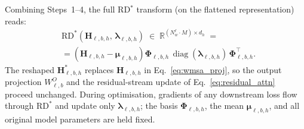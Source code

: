Combining Steps~1--4, the full RD$^*$\xspace transform (on the flattened
representation) reads:
\begin{equation}
\begin{aligned}
    &\mathrm{RD}^*\!\left(\mathbf{H}_{\ell,b,h},\,
                          \boldsymbol{\lambda}_{\ell,b,h}\right) \;\in\; \mathbb{R}^{(N_w^\ell \cdot M) \times d_h}
    \;=\;\\
    &=\left(\mathbf{H}_{\ell,b,h} - \boldsymbol{\mu}_{\ell,b,h}\right)
    \boldsymbol{\Phi}_{\ell,b,h}\,
    \operatorname{diag}(\boldsymbol{\lambda}_{\ell,b,h})\,
    \boldsymbol{\Phi}_{\ell,b,h}^\top.
\end{aligned}
\label{eq:rd_star}
\end{equation}
The reshaped $\mathbf{H}^*_{\ell,b,h}$ replaces $\mathbf{H}_{\ell,b,h}$
in Eq.~\eqref{eq:wmsa_proj}, so the output projection $W^O_{\ell,b}$
and the residual-stream update of Eq.~\eqref{eq:residual_attn} proceed
unchanged. During optimisation, gradients of any downstream loss flow
through $\mathrm{RD}^*$ and update only
$\boldsymbol{\lambda}_{\ell,b,h}$; the basis
$\boldsymbol{\Phi}_{\ell,b,h}$, the mean $\boldsymbol{\mu}_{\ell,b,h}$,
and all original model parameters are held fixed.